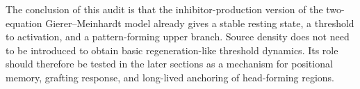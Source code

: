 The conclusion of this audit is that the inhibitor-production version of the
two-equation Gierer--Meinhardt model already gives a stable resting state, a
threshold to activation, and a pattern-forming upper branch. Source density does
not need to be introduced to obtain basic regeneration-like threshold dynamics.
Its role should therefore be tested in the later sections as a mechanism for
positional memory, grafting response, and long-lived anchoring of head-forming
regions.
